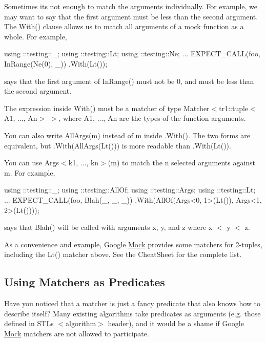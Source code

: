 Sometimes it\textquotesingle{}s not enough to match the arguments individually. For example, we may want to say that the first argument must be less than the second argument. The {\ttfamily With()} clause allows us to match all arguments of a mock function as a whole. For example,


\begin{DoxyCode}
using ::testing::\_;
using ::testing::Lt;
using ::testing::Ne;
...
  EXPECT\_CALL(foo, InRange(Ne(0), \_))
      .With(Lt());
\end{DoxyCode}


says that the first argument of {\ttfamily In\+Range()} must not be 0, and must be less than the second argument.

The expression inside {\ttfamily With()} must be a matcher of type {\ttfamily Matcher$<$tr1\+::tuple$<$A1, ..., An$>$ $>$}, where {\ttfamily A1}, ..., {\ttfamily An} are the types of the function arguments.

You can also write {\ttfamily All\+Args(m)} instead of {\ttfamily m} inside {\ttfamily .With()}. The two forms are equivalent, but {\ttfamily .With(All\+Args(\+Lt()))} is more readable than {\ttfamily .With(\+Lt())}.

You can use {\ttfamily Args$<$k1, ..., kn$>$(m)} to match the {\ttfamily n} selected arguments against {\ttfamily m}. For example,


\begin{DoxyCode}
using ::testing::\_;
using ::testing::AllOf;
using ::testing::Args;
using ::testing::Lt;
...
  EXPECT\_CALL(foo, Blah(\_, \_, \_))
      .With(AllOf(Args<0, 1>(Lt()), Args<1, 2>(Lt())));
\end{DoxyCode}


says that {\ttfamily Blah()} will be called with arguments {\ttfamily x}, {\ttfamily y}, and {\ttfamily z} where {\ttfamily x $<$ y $<$ z}.

As a convenience and example, Google \hyperlink{class_mock}{Mock} provides some matchers for 2-\/tuples, including the {\ttfamily Lt()} matcher above. See the Cheat\+Sheet for the complete list.

\subsection*{Using Matchers as Predicates}

Have you noticed that a matcher is just a fancy predicate that also knows how to describe itself? Many existing algorithms take predicates as arguments (e.\+g. those defined in S\+TL\textquotesingle{}s {\ttfamily $<$algorithm$>$} header), and it would be a shame if Google \hyperlink{class_mock}{Mock} matchers are not allowed to participate.

